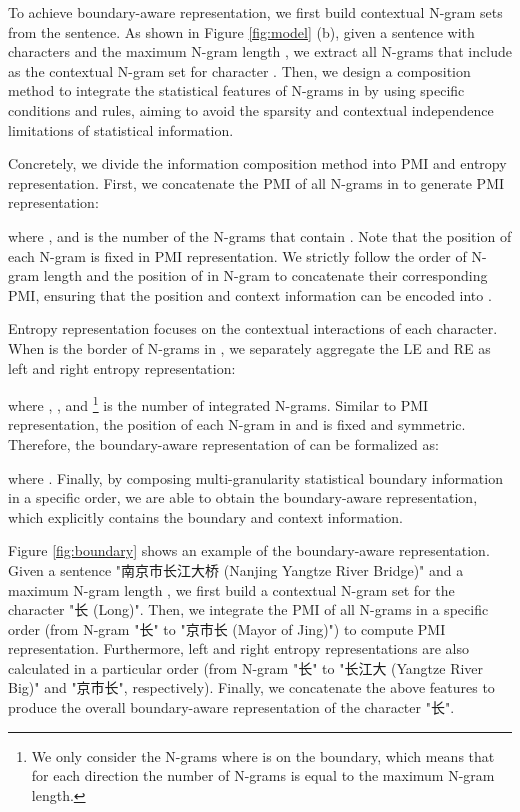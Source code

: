 \documentclass[11pt]{article}
\begin{document}
\begin{CJK}{UTF8}{gbsn}
To achieve boundary-aware representation, we first build contextual N-gram sets from the sentence.
As shown in Figure \ref{fig:model} (b), given a sentence  with  characters and the maximum N-gram length ,
we extract all N-grams that include  as the contextual N-gram set  for character .
Then, we design a composition method to integrate the statistical features of N-grams in  by using specific conditions and rules,
aiming to avoid the sparsity and contextual independence limitations of statistical information.


Concretely, we divide the information composition method into PMI and entropy representation.
First, we concatenate the PMI of all N-grams in  to generate PMI representation:

where , and  is the number of the N-grams that contain .
Note that the position of each N-gram is fixed in PMI representation.
We strictly follow the order of N-gram length and the position of  in N-gram to concatenate their corresponding PMI,
ensuring that the position and context information can be encoded into .


Entropy representation focuses on the contextual interactions of each character.
When  is the border of N-grams in ,
we separately aggregate the LE and RE as left and right entropy representation:

where , , and \footnote{We only consider the N-grams where  is on the boundary, which means that for each direction the number of N-grams is equal to the maximum N-gram length.}
is the number of integrated N-grams.
Similar to PMI representation, the position of each N-gram in  and  is fixed and symmetric.
Therefore, the boundary-aware representation  of  can be formalized as:

where .
Finally, by composing multi-granularity statistical boundary information in a specific order,
we are able to obtain the boundary-aware representation,
which explicitly contains the boundary and context information.

Figure \ref{fig:boundary} shows an example of the boundary-aware representation.
Given a sentence "南京市长江大桥 (Nanjing Yangtze River Bridge)" and a maximum N-gram length ,
we first build a contextual N-gram set for the character "长 (Long)".
Then, we integrate the PMI of all N-grams in a specific order (from N-gram "长" to "京市长 (Mayor of Jing)") to compute PMI representation. Furthermore, left and right entropy representations are also calculated in a particular order (from N-gram "长" to "长江大  (Yangtze River Big)" and "京市长", respectively).
Finally, we concatenate the above features to produce the overall boundary-aware representation of the character "长".




\end{CJK}
\end{document}
